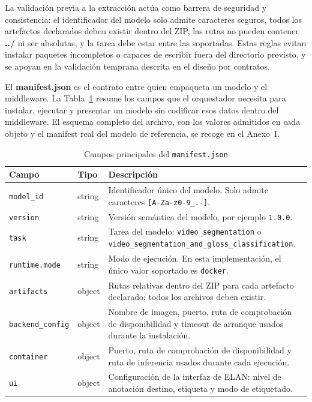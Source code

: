 La validación previa a la extracción actúa como barrera de seguridad y consistencia: el identificador del modelo solo admite caracteres seguros, todos los artefactos declarados deben existir dentro del ZIP, las rutas no pueden contener \textbf{../} ni ser absolutas, y la tarea debe estar entre las soportadas. Estas reglas evitan instalar paquetes incompletos o capaces de escribir fuera del directorio previsto, y se apoyan en la validación temprana descrita en el diseño por contratos.

El \textbf{manifest.json} es el contrato entre quien empaqueta un modelo y el middleware. La Tabla~\ref{tab:manifest_campos} resume los campos que el orquestador necesita para instalar, ejecutar y presentar un modelo sin codificar esos datos dentro del middleware. El esquema completo del archivo, con los valores admitidos en cada objeto y el manifest real del modelo de referencia, se recoge en el Anexo~I.

\begin{table}[H]
\centering
\caption{Campos principales del \texttt{manifest.json}}
\label{tab:manifest_campos}
\small
\renewcommand{\arraystretch}{1.15}
\begin{tabular}{@{}>{\raggedright\arraybackslash}p{3.1cm}>{\raggedright\arraybackslash}p{2.1cm}>{\raggedright\arraybackslash}p{7.2cm}@{}}
\toprule
\textbf{Campo} & \textbf{Tipo} & \textbf{Descripción} \\
\midrule
\texttt{model\_id} & string & Identificador único del modelo. Solo admite caracteres \texttt{[A-Za-z0-9\_.-]}. \\
\texttt{version} & string & Versión semántica del modelo, por ejemplo \texttt{1.0.0}. \\
\texttt{task} & string & Tarea del modelo: \texttt{video\_segmentation} o \newline\texttt{video\_segmentation\_and}\newline\texttt{\_gloss\_classification}. \\
\texttt{runtime.mode} & string & Modo de ejecución. En esta implementación, el único valor soportado es \texttt{docker}. \\
\texttt{artifacts} & object & Rutas relativas dentro del ZIP para cada artefacto declarado; todos los archivos deben existir. \\
\texttt{backend\_config} & object & Nombre de imagen, puerto, ruta de comprobación de disponibilidad y timeout de arranque usados durante la instalación. \\
\texttt{container} & object & Puerto, ruta de comprobación de disponibilidad y ruta de inferencia usados durante cada ejecución. \\
\texttt{ui} & object & Configuración de la interfaz de ELAN: nivel de anotación destino, etiqueta y modo de etiquetado. \\
\bottomrule
\end{tabular}
\end{table}

